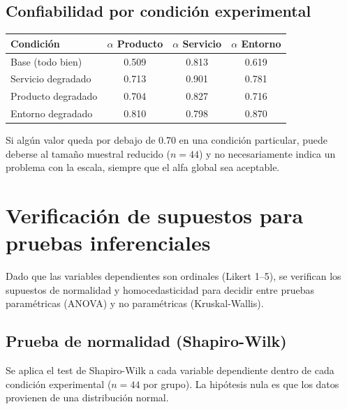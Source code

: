 \documentclass[
  spanish,
]{article}
\begin{document}
\subsection{Confiabilidad por condición
experimental}\label{confiabilidad-por-condiciuxf3n-experimental}

\begin{table}[!h]
\centering
\begin{tabular}{lccc}
\toprule
Condición & $\alpha$ Producto & $\alpha$ Servicio & $\alpha$ Entorno\\
\midrule
Base (todo bien) & 0.509 & 0.813 & 0.619\\
Servicio degradado & 0.713 & 0.901 & 0.781\\
Producto degradado & 0.704 & 0.827 & 0.716\\
Entorno degradado & 0.810 & 0.798 & 0.870\\
\bottomrule
\end{tabular}
\end{table}

Si algún valor queda por debajo de 0.70 en una condición particular,
puede deberse al tamaño muestral reducido (\(n = 44\)) y no
necesariamente indica un problema con la escala, siempre que el alfa
global sea aceptable.

\newpage

\section{Verificación de supuestos para pruebas
inferenciales}\label{verificaciuxf3n-de-supuestos-para-pruebas-inferenciales}

Dado que las variables dependientes son ordinales (Likert 1--5), se
verifican los supuestos de normalidad y homocedasticidad para decidir
entre pruebas paramétricas (ANOVA) y no paramétricas (Kruskal-Wallis).

\subsection{Prueba de normalidad
(Shapiro-Wilk)}\label{prueba-de-normalidad-shapiro-wilk}

Se aplica el test de Shapiro-Wilk a cada variable dependiente dentro de
cada condición experimental (\(n = 44\) por grupo). La hipótesis nula es
que los datos provienen de una distribución normal.
\end{document}
